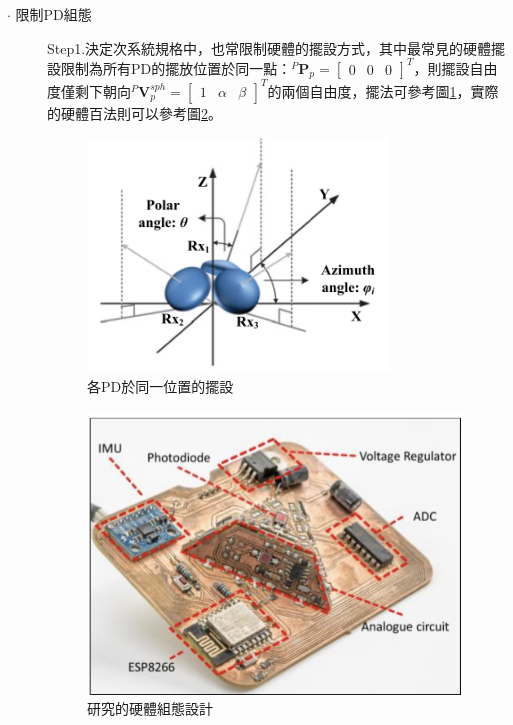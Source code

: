 \begin{description}
        \item[$\cdot$ 限制PD組態]\hfill
        
        \qquad
        Step1.決定次系統規格中，也常限制硬體的擺設方式，其中最常見的硬體擺設限制為所有PD的擺放位置於同一點：$^P\boldsymbol{P}_p=
        \left[\begin{array}{ccc}0&0&0\end{array}\right]^T$，則擺設自由度僅剩下朝向$^P\boldsymbol{V}_p^{sph} = \left[\begin{array}{ccc}1&\alpha&\beta\end{array}\right]^T$的兩個自由度，擺法可參考圖\ref{pic:config_orient}，實際的硬體百法則可以參考圖\ref{pic:ml_pd_config}\cite{case_ml}。
        
        \begin{figure}[htpb]
            \centering
            \includegraphics[width=8cm]{ch2pic/config_orient.png}
            \caption{各PD於同一位置的擺設\cite{case:3d_layers}}
            \label{pic:config_orient}
        \end{figure}

        \begin{figure}[htpb]
            \centering
            \includegraphics[width=10cm]{ch2pic/ml_pd_config.png}
            \caption{\cite{case:ml}研究的硬體組態設計}
            \label{pic:ml_pd_config}
        \end{figure}


\end{description}
